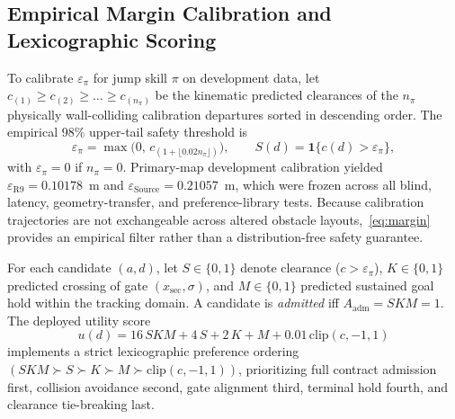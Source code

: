 \documentclass[letterpaper,10pt,conference]{ieeeconf}
\begin{document}
\subsection{Empirical Margin Calibration and Lexicographic Scoring}
To calibrate $\varepsilon_\pi$ for jump skill $\pi$ on development data, let $c_{(1)}\ge c_{(2)}\ge\dots\ge c_{(n_\pi)}$ be the kinematic predicted clearances of the $n_\pi$ physically wall-colliding calibration departures sorted in descending order. The empirical 98\% upper-tail safety threshold is
\begin{equation}
  \varepsilon_\pi = \max\!\bigl(0,\,c_{(1+\lfloor 0.02 n_\pi\rfloor)}\bigr),
  \qquad S(d) = \mathbf{1}\bigl\{c(d)>\varepsilon_\pi\bigr\},
  \label{eq:margin}
\end{equation}
with $\varepsilon_\pi=0$ if $n_\pi=0$. Primary-map development calibration yielded $\varepsilon_{\mathrm{R9}}=0.10178$~m and $\varepsilon_{\mathrm{Source}}=0.21057$~m, which were frozen across all blind, latency, geometry-transfer, and preference-library tests. Because calibration trajectories are not exchangeable across altered obstacle layouts,~\eqref{eq:margin} provides an empirical filter rather than a distribution-free safety guarantee.

For each candidate $(a,d)$, let $S\in\{0,1\}$ denote clearance ($c>\varepsilon_\pi$), $K\in\{0,1\}$ predicted crossing of gate $(x_{\mathrm{sec}},\sigma)$, and $M\in\{0,1\}$ predicted sustained goal hold within the tracking domain. A candidate is \emph{admitted} iff $A_{\mathrm{adm}}=S K M=1$. The deployed utility score
\begin{equation}
  u(d) = 16\,S K M + 4\,S + 2\,K + M + 0.01\,\mathrm{clip}(c,-1,1)
  \label{eq:score}
\end{equation}
implements a strict lexicographic preference ordering $(S K M \succ S \succ K \succ M \succ \mathrm{clip}(c,-1,1))$, prioritizing full contract admission first, collision avoidance second, gate alignment third, terminal hold fourth, and clearance tie-breaking last.
\end{document}
